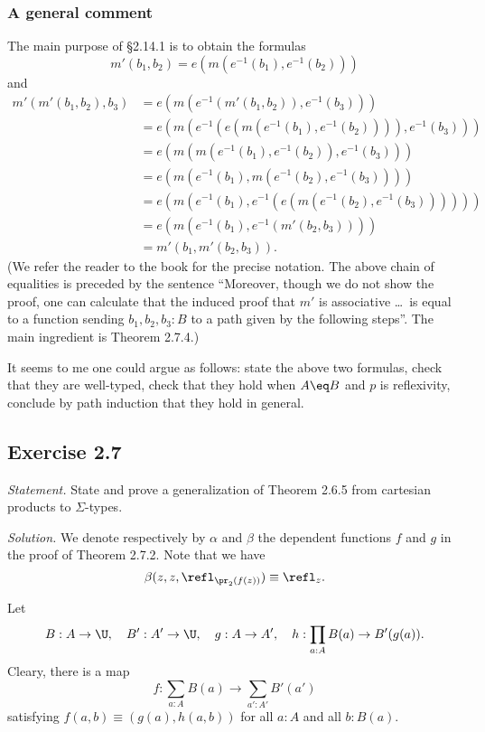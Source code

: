 \documentclass[12pt]{article}
\begin{document}
\subsubsection{A general comment}

The main purpose of \S2.14.1 is to obtain the formulas
$$
m'(b_1,b_2)=e(m(e^{-1}(b_1),e^{-1}(b_2)))
$$ 
and
\begin{equation*}
  \begin{aligned}
    m'(m'(b_1,b_2),b_3)
    &= e(m(e^{-1}(m'(b_1,b_2)),e^{-1}(b_3))) \\
    &= e(m(e^{-1}(e(m(e^{-1}(b_1),e^{-1}(b_2)))),e^{-1}(b_3))) \\
    &= e(m(m(e^{-1}(b_1),e^{-1}(b_2)),e^{-1}(b_3))) \\
    &= e(m(e^{-1}(b_1),m(e^{-1}(b_2),e^{-1}(b_3)))) \\
    &= e(m(e^{-1}(b_1),e^{-1}(e(m(e^{-1}(b_2),e^{-1}(b_3)))))) \\
    &= e(m(e^{-1}(b_1),e^{-1}(m'(b_2,b_3)))) \\
    &= m'(b_1,m'(b_2,b_3)).
\end{aligned}
\end{equation*}
(We refer the reader to the book for the precise notation. The above chain of equalities is preceded by the sentence ``Moreover, though we do not show the proof, one can calculate that the induced proof that $m'$ is associative \dots\ is equal to a function sending $b_1,b_2,b_3:B$ to a path given by the following steps''. The main ingredient is Theorem 2.7.4.)

It seems to me one could argue as follows: state the above two formulas, check that they are well-typed, check that they hold when $A\eq B$ and $p$ is reflexivity, conclude by path induction that they hold in general.


\subsection{Exercise 2.7}

\emph{Statement.} State and prove a generalization of Theorem 2.6.5 from cartesian products to $\Sigma$-types. 

\nn\emph{Solution.} We denote respectively by $\alpha$ and $\beta$ the dependent functions $f$ and $g$ in the proof of Theorem 2.7.2. Note that we have 
$$
\beta(z,z,\refl_{\pr_2(f(z))})\equiv\refl_z.
$$

Let 
$$
B:A\to\U,\quad B':A'\to\U,\quad g:A\to A',\quad h:\prod_{a:A}B(a)\to B'(g(a)).
$$ 
Cleary, there is a map 
$$
f:\sum_{a:A}B(a)\to\sum_{a':A'}B'(a')
$$ 
satisfying $f(a,b)\equiv (g(a),h(a,b))$ for all $a:A$ and all $b:B(a)$. 
\end{document}
